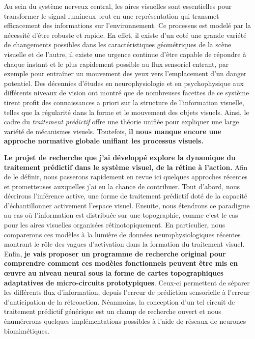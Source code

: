 \documentclass[11pt,french,a4paper,oneside]{article}%
\begin{document}
Au sein du système nerveux central, les aires visuelles sont
essentielles pour transformer le signal lumineux brut en une
représentation qui transmet efficacement des informations sur
l'environnement. Ce processus est modelé par la nécessité d'être robuste
et rapide. En effet, il existe d'un coté une grande variété de
changements possibles dans les caractéristiques géométriques de la
scène visuelle et de l'autre, il existe une urgence continue d'être capable de répondre à chaque instant et le plus rapidement
possible au flux sensoriel entrant, par exemple pour entraîner un
mouvement des yeux vers l'emplacement d'un danger potentiel. Des
décennies d'études en neurophysiologie et en psychophysique aux
différents niveaux de vision ont montré que de nombreuses facettes de ce système tirent profit des
connaissances a priori sur la structure de l'information visuelle,
telles que la régularité dans la forme et le mouvement des objets
visuels. Ainsi, le cadre du \emph{traitement prédictif} offre une théorie
unifiée pour expliquer une large variété de mécanismes visuels. Toutefois, \textbf{il
nous manque encore une approche normative globale unifiant les
processus visuels.}

\textbf{Le projet de recherche que j'ai développé
explore la dynamique du traitement prédictif dans le système visuel,
de la rétine à l'action.}
Afin de le définir, nous passerons rapidement en revue ici quelques approches récentes et
prometteuses auxquelles j'ai eu la chance de contribuer. Tout d'abord, nous décrirons l'inférence active, une forme
de traitement prédictif doté de la capacité d'échantillonner activement
l'espace visuel. Ensuite, nous étendrons ce paradigme au cas où
l'information est distribuée sur une topographie, comme c'est le cas
pour les aires visuelles organisées rétinotopiquement. En particulier,
nous comparerons ces modèles à la lumière de données neurophysiologiques
récentes montrant le rôle des vagues d'activation dans la formation du
traitement visuel. Enfin, \textbf{je vais proposer un programme de recherche original
pour comprendre comment ces modèles fonctionnels peuvent être mis en
œuvre au niveau neural sous la forme de cartes topographiques adaptatives de micro-circuits
prototypiques}. Ceux-ci permettent de séparer les différents flux
d'information, depuis l'erreur de prédiction sensorielle à l'erreur d'anticipation de la rétroaction.
Néanmoins, la conception d'un tel
circuit de traitement prédictif générique est un champ de recherche ouvert et nous énumérerons quelques implémentations possibles à l'aide
de réseaux de neurones biomimétiques.
\end{document}
